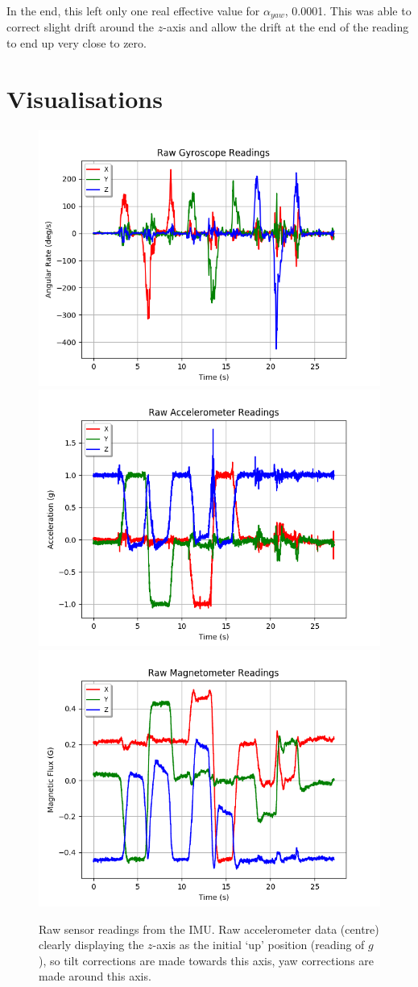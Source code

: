 \documentclass[11pt]{article}
\begin{document}
\begin{enumerate}
In the end, this left only one real effective value for $\alpha_{yaw}$, 0.0001. This was able to correct slight drift around the $z$-axis and allow the drift at the end of the reading to end up very close to zero.

\end{enumerate}

\section*{Visualisations}

\begin{figure}[htp]

\centering
\includegraphics[width=.32\textwidth]{gyro-unaltered}\hfill
\includegraphics[width=.32\textwidth]{acc-unaltered}\hfill
\includegraphics[width=.32\textwidth]{mag-unaltered}

\caption{Raw sensor readings from the IMU. Raw accelerometer data (centre) clearly displaying the $z$-axis as the initial `up' position (reading of $g$), so tilt corrections are made towards this axis, yaw corrections are made around this axis.}
\label{fig:raw-readings}

\end{figure}
\end{document}
